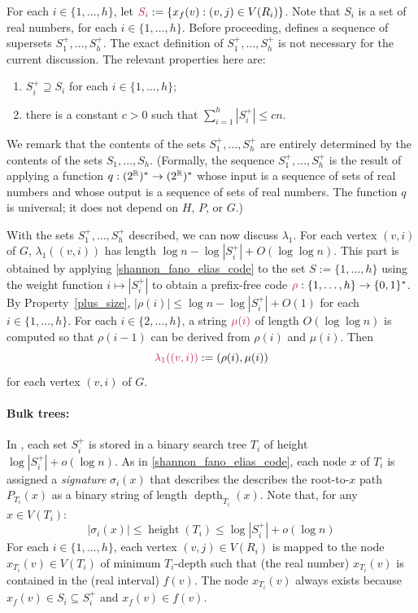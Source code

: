 \documentclass{patmorin}
\makeatletter
\DeclareMathOperator{\height}{height}
\DeclareMathOperator{\depth}{depth}
\renewcommand{\le}{\leqslant}
\newcommand{\defin}[1]{\emph{\textcolor{brightmaroon}{#1}}}
\def\mathcolor#1#{\@mathcolor{#1}}
\def\@mathcolor#1#2#3{%
  \protect\leavevmode
  \begingroup
    \color#1{#2}#3%
  \endgroup
}
\newcommand{\mathdefin}[1]{\mathcolor{brightmaroon}{#1}}
\makeatother
\begin{document}
  For each $i\in\{1,\ldots,h\}$, let $\mathdefin{S_i}:=\{x_f(v):(v,j)\in V(R_i)\}$. Note that $S_i$ is a set of real numbers, for each $i\in\{1,\ldots,h\}$. Before proceeding, \cite{dujmovic.esperet.ea:adjacency} defines a sequence of supersets \defin{$S^+_1,\ldots,S^+_h$}. The exact definition of $S^+_1,\ldots,S^+_h$ is not necessary for the current discussion.  The relevant properties here are:
  \begin{enumerate}[label=(\alph*)]
      \item\label{plus_superset} $S^+_i\supseteq S_i$ for each $i\in\{1,\ldots,h\}$;
      \item\label{plus_size} there is a constant $c>0$ such that $\sum_{i=1}^h |S^+_i|\le cn$.
  \end{enumerate}
  We remark that the contents of the sets $S^+_1,\ldots,S^+_h$ are entirely determined by the contents of the sets $S_1,\ldots,S_h$.  (Formally, the sequence $S^+_1,\ldots,S^+_h$ is the result of applying a function $q:(2^{\mathbb{R}})^*\to (2^{\mathbb{R}})^*$ whose input is a sequence of sets of real numbers and whose output is a sequence of sets of real numbers. The function $q$ is universal; it does not depend on $H$, $P$, or $G$.)

  With the sets $S^+_1,\ldots,S^+_h$ described, we can now discuss $\lambda_1$.
  For each vertex $(v,i)$ of $G$, $\lambda_1((v,i))$ has length $\log n - \log |S^+_i| + O(\log\log n)$. This part is obtained by applying \cref{shannon_fano_elias_code} to the set $S:=\{1,\ldots,h\}$ using the weight function $i \mapsto |S^+_i|$ to obtain a prefix-free code $\mathdefin{\rho}:\{1,\ldots,h\}\to\{0,1\}^*$. By Property~\ref{plus_size}, $|\rho(i)|\le \log n - \log|S^+_i| + O(1)$ for each $i\in\{1,\ldots,h\}$.  For each $i\in\{2,\ldots,h\}$, a string $\mathdefin{\mu(i)}$ of length $O(\log\log n)$ is computed so that $\rho(i-1)$ can be derived from $\rho(i)$ and $\mu(i)$.  Then
  \[
     \mathdefin{\lambda_1((v,i))}:=(\rho(i),\mu(i))
  \]
  for each vertex $(v,i)$ of $G$.

  \paragraph{Bulk trees:}
  In \cite{dujmovic.esperet.ea:adjacency}, each set $S^+_i$ is stored in a binary search tree $T_i$ of height $\log|S^+_i|+o(\log n)$. As in \cref{shannon_fano_elias_code}, each node $x$ of $T_i$ is assigned a \defin{signature} \defin{$\sigma_i(x)$} that describes the describes the root-to-$x$ path $P_{T_i}(x)$ as a binary string of length $\depth_{T_i}(x)$. Note that, for any $x\in V(T_i)$:
  \[
    |\sigma_i(x)| \le \height(T_i) \le \log|S^+_i|+o(\log n)
  \]
  For each $i\in\{1,\ldots,h\}$, each vertex $(v,j)\in V(R_i)$ is mapped to the node $x_{T_i}(v)\in V(T_i)$ of minimum $T_i$-depth such that (the real number) $x_{T_i}(v)$ is contained in the (real interval) $f(v)$. The node $x_{T_i}(v)$ always exists because $x_f(v)\in S_i\subseteq S_i^+$ and $x_f(v)\in f(v)$.
\end{document}
